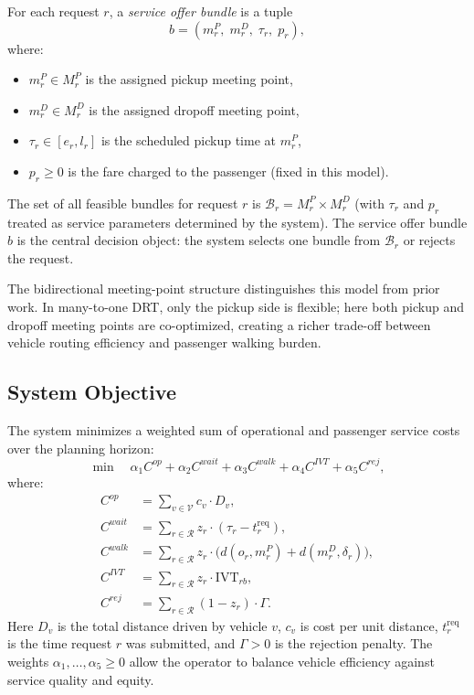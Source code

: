 For each request $r$, a \emph{service offer bundle} is a tuple
\[
  b = (m_r^P,\; m_r^D,\; \tau_r,\; p_r),
\]
where:
\begin{itemize}
  \item $m_r^P \in M_r^P$ is the assigned pickup meeting point,
  \item $m_r^D \in M_r^D$ is the assigned dropoff meeting point,
  \item $\tau_r \in [e_r, l_r]$ is the scheduled pickup time at $m_r^P$,
  \item $p_r \geq 0$ is the fare charged to the passenger (fixed in this model).
\end{itemize}
The set of all feasible bundles for request $r$ is $\mathcal{B}_r = M_r^P \times M_r^D$
(with $\tau_r$ and $p_r$ treated as service parameters determined by the system).
The service offer bundle $b$ is the central decision object: the system selects one bundle
from $\mathcal{B}_r$ or rejects the request.

The bidirectional meeting-point structure distinguishes this model from prior work. In
many-to-one DRT, only the pickup side is flexible; here both pickup and dropoff meeting
points are co-optimized, creating a richer trade-off between vehicle routing efficiency
and passenger walking burden.

\subsection{System Objective}

The system minimizes a weighted sum of operational and passenger service costs over the
planning horizon:
\begin{equation}\label{eq:objective}
  \min \quad \alpha_1 C^{op} + \alpha_2 C^{wait} + \alpha_3 C^{walk}
             + \alpha_4 C^{IVT} + \alpha_5 C^{rej},
\end{equation}
where:
\begin{align}
  C^{op}   &= \sum_{v \in \mathcal{V}} c_v \cdot D_v, \label{eq:cop}\\
  C^{wait} &= \sum_{r \in \mathcal{R}} z_r \cdot (\tau_r - t_r^{\text{req}}), \label{eq:cwait}\\
  C^{walk} &= \sum_{r \in \mathcal{R}} z_r \cdot \bigl(d(o_r, m_r^P) + d(m_r^D, \delta_r)\bigr), \label{eq:cwalk}\\
  C^{IVT}  &= \sum_{r \in \mathcal{R}} z_r \cdot \text{IVT}_{rb}, \label{eq:civt}\\
  C^{rej}  &= \sum_{r \in \mathcal{R}} (1 - z_r) \cdot \Gamma. \label{eq:crej}
\end{align}
Here $D_v$ is the total distance driven by vehicle $v$, $c_v$ is cost per unit distance,
$t_r^{\text{req}}$ is the time request $r$ was submitted, and $\Gamma > 0$ is the rejection
penalty. The weights $\alpha_1, \ldots, \alpha_5 \geq 0$ allow the operator to balance
vehicle efficiency against service quality and equity.

